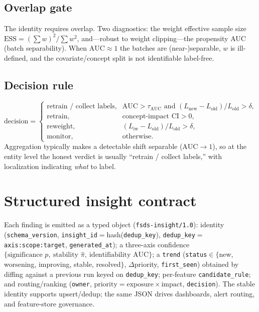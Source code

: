 \documentclass[11pt]{article}
\begin{document}
\subsection{Overlap gate}
The identity requires overlap. Two diagnostics: the weight effective sample size
$\mathrm{ESS}=(\sum w)^2/\sum w^2$, and---robust to weight clipping---the
propensity AUC (batch separability). When $\mathrm{AUC}\approx1$ the batches are
(near-)separable, $w$ is ill-defined, and the covariate/concept split is not
identifiable label-free.

\subsection{Decision rule}
\begin{equation}
\text{decision}=
\begin{cases}
\text{retrain / collect labels}, & \mathrm{AUC}>\tau_{\mathrm{AUC}}\text{ and }
   (L_{\mathrm{new}}-L_{\mathrm{old}})/L_{\mathrm{old}}>\delta,\\
\text{retrain}, & \text{concept-impact CI}>0,\\
\text{reweight}, & (L_{\mathrm{iw}}-L_{\mathrm{old}})/L_{\mathrm{old}}>\delta,\\
\text{monitor}, & \text{otherwise.}
\end{cases}
\end{equation}
Aggregation typically makes a detectable shift separable ($\mathrm{AUC}\to1$), so
at the entity level the honest verdict is usually ``retrain / collect labels,''
with localization indicating \emph{what} to label.

\section{Structured insight contract}

Each finding is emitted as a typed object (\texttt{fsds-insight/1.0}):
identity (\texttt{schema\_version}, \texttt{insight\_id}$=$hash(\texttt{dedup\_key}),
\texttt{dedup\_key}$=$\texttt{axis:scope:target}, \texttt{generated\_at}); a
three-axis confidence $\{\text{significance }p,\ \text{stability }\hat\pi,\
\text{identifiability AUC}\}$; a \texttt{trend}
(\texttt{status}$\in\{$new, worsening, improving, stable, resolved$\}$,
$\Delta$priority, \texttt{first\_seen}) obtained by diffing against a previous
run keyed on \texttt{dedup\_key}; per-feature \texttt{candidate\_rule}; and
routing/ranking (\texttt{owner}, $\text{priority}=\text{exposure}\times\text{impact}$,
\texttt{decision}). The stable identity supports upsert/dedup; the same JSON
drives dashboards, alert routing, and feature-store governance.
\end{document}
